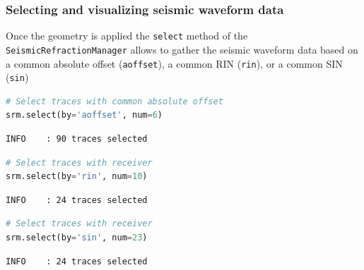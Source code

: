\documentclass[a4paper,fleqn]{cas-sc}
\begin{document}
\subsubsection{Selecting and visualizing seismic waveform data}
Once the geometry is applied the \texttt{select} method of the \texttt{SeismicRefractionManager} allows to gather the seismic waveform data based on a common absolute offset (\texttt{aoffset}), a common RIN (\texttt{rin}), or a common SIN (\texttt{sin})
\begin{lstlisting}[language=Python, firstnumber=6]
# Select traces with common absolute offset
srm.select(by='aoffset', num=6)
\end{lstlisting}
\begin{footnotesize}
\begin{verbatim}
INFO    : 90 traces selected
\end{verbatim}
\end{footnotesize}
\begin{lstlisting}[language=Python, firstnumber=8]
# Select traces with receiver
srm.select(by='rin', num=10)
\end{lstlisting}
\begin{footnotesize}
\begin{verbatim}
INFO    : 24 traces selected
\end{verbatim}
\end{footnotesize}
\begin{lstlisting}[language=Python, firstnumber=10]
# Select traces with receiver
srm.select(by='sin', num=23)
\end{lstlisting}
\begin{footnotesize}
\begin{verbatim}
INFO    : 24 traces selected
\end{verbatim}
\end{footnotesize}
\end{document}
